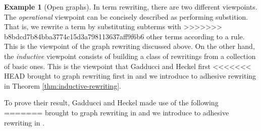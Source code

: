 \documentclass{amsart}
\theoremstyle{remark}
\theoremstyle{definition}
\newtheorem{example}[theorem]{Example}
\begin{document}
\begin{example}[Open graphs]
In term rewriting, there are two different viewpoints. The
\emph{operational} viewpoint can be concisely described as performing
substition. That is, we rewrite a term by substituting subterms with
>>>>>>> b8bdcd7b84bba3774c15d3a798113637aff9f6b6
other terms according to a rule. This is the viewpoint of the graph
rewriting discussed above.  On the other hand, the \emph{inductive}
viewpoint consists of building a class of rewritings from a collection
of basic ones.  This is the viewpoint that Gadducci and Heckel first
<<<<<<< HEAD
brought to graph rewriting first in \cite{Gadd_IndGraphTrans}
and we introduce to adhesive rewriting in Theorem \ref{thm:inductive-rewriting}.

To prove their result, Gadducci and Heckel made use of the following
=======
brought to graph rewriting in
%
%
and we introduce to adhesive rewriting in .
%
%


\end{example}
\end{document}
